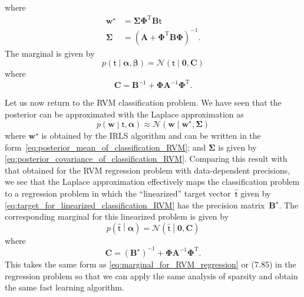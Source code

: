 \documentclass[12pt,a4paper]{article}
\begin{document}
where
\begin{align}
\mathbf{w}^{\star} &= \bm{\Sigma} \bm{\Phi}^{\operatorname{T}} \mathbf{B} \bm{\mathsf{t}} \\
\bm{\Sigma} &= \left(
\mathbf{A} + \bm{\Phi}^{\operatorname{T}} \mathbf{B} \bm{\Phi}
\right)^{-1} .
\end{align}
The marginal is given by
\begin{equation}
p \left( \bm{\mathsf{t}} \middle| \bm{\alpha}, \bm{\beta} \right)
= \mathcal{N} \left( \bm{\mathsf{t}} \middle| \mathbf{0}, \mathbf{C} \right)
\label{eq:marginal_for_RVM_regression}
\end{equation}
where
\begin{equation}
\mathbf{C} = \mathbf{B}^{-1} + \bm{\Phi} \mathbf{A}^{-1} \bm{\Phi}^{\operatorname{T}} .
\end{equation}

Let us now return to the RVM classification problem.
We have seen that the posterior can be approximated with the Laplace approximation as
\begin{equation}
p \left( \mathbf{w} \middle| \bm{\mathsf{t}}, \bm{\alpha} \right)
\approx
\mathcal{N}\left( \mathbf{w} \middle| \mathbf{w}^{\star}, \bm{\Sigma} \right)
\end{equation}
where $\mathbf{w}^{\star}$ is obtained by the IRLS algorithm and
can be written in the form~\eqref{eq:posterior_mean_of_classification_RVM};
and $\bm{\Sigma}$ is given by \eqref{eq:posterior_covariance_of_classification_RVM}.
Comparing this result with that obtained for
the RVM regression problem with data-dependent precisions,
we see that the Laplace approximation effectively maps the classification problem to
a regression problem in which the ``linearized'' target vector~$\widehat{\bm{\mathsf{t}}}$
given by \eqref{eq:target_for_linearized_classification_RVM}
has the precision matrix~$\mathbf{B}^{\star}$.
The corresponding marginal for this linearized problem is given by
\begin{equation}
p \left( \widehat{\bm{\mathsf{t}}} \middle| \bm{\alpha} \right)
= \mathcal{N}\left( \widehat{\bm{\mathsf{t}}} \middle| \mathbf{0}, \mathbf{C} \right)
\end{equation}
where
\begin{equation}
\mathbf{C}
= \left( \mathbf{B}^{\star} \right)^{-1}
+ \bm{\Phi} \mathbf{A}^{-1} \bm{\Phi}^{\operatorname{T}} .
\label{eq:marginal_covariance_of_linearized_classification_RVM}
\end{equation}
This takes the same form as \eqref{eq:marginal_for_RVM_regression} or (7.85)
in the regression problem
so that we can apply the same analysis of sparsity and obtain the same fast learning algorithm.
\end{document}

